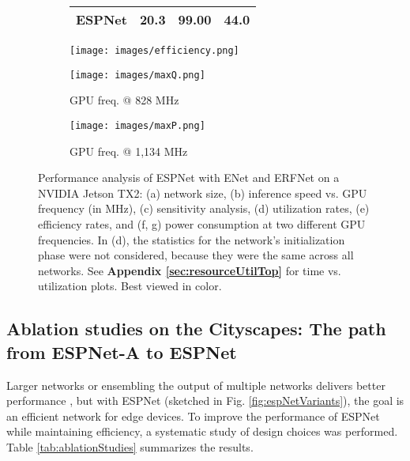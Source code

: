 \documentclass[runningheads]{llncs}
\def\Fig{Fig. }
\begin{document}
\begin{figure}[t!]
\begin{subfigure}[b]{0.24\columnwidth}
{\begin{tabular}{|l|c|c|c|}
				\multicolumn{1}{|l|}{\textbf{ESPNet}} & 20.3 & 99.00 & \textbf{44.0} \\ \hline
			\end{tabular}
		}
		\caption{}
		\label{fig:utilization}
	\end{subfigure}
	\vfill
	\begin{subfigure}[b]{0.32\columnwidth}
		\texttt{[image: images/efficiency.png]}
		\caption{}
		\label{fig:efficiency}
	\end{subfigure}
	\hfill
	\begin{subfigure}[b]{0.32\columnwidth}
		\texttt{[image: images/maxQ.png]}
		\caption{GPU freq. @ 828 MHz}
		\label{fig:maxQ}
	\end{subfigure}
	\hfill
	\begin{subfigure}[b]{0.32\columnwidth}
		\texttt{[image: images/maxP.png]}
		\caption{GPU freq. @ 1,134 MHz}
		\label{fig:maxP}
	\end{subfigure}
	\caption{Performance analysis of ESPNet with ENet and ERFNet on a NVIDIA Jetson TX2: (a) network size, (b) inference speed vs. GPU frequency (in MHz), (c) sensitivity analysis, (d) utilization rates,  (e) efficiency rates, and (f, g) power consumption at two different GPU frequencies. In (d), the statistics for the network's initialization phase were not considered, because they were the same across all networks. See \textbf{Appendix  \ref{sec:resourceUtilTop}} for time vs. utilization plots. Best viewed in color.}
	\label{fig:perfCharacter}
\end{figure}

\subsection{Ablation studies on the Cityscapes: The path from ESPNet-A to ESPNet}
\label{ssec:ablationStudies}

Larger networks or ensembling the output of multiple networks delivers better performance \cite{zhao2017pyramid,chen2016deeplab,yu2017dilated}, but with ESPNet (sketched in \Fig \ref{fig:espNetVariants}), the goal is an efficient network for edge devices. To improve the performance of ESPNet while maintaining efficiency, a systematic study of design choices was performed. Table \ref{tab:ablationStudies} summarizes the results.
\end{document}
